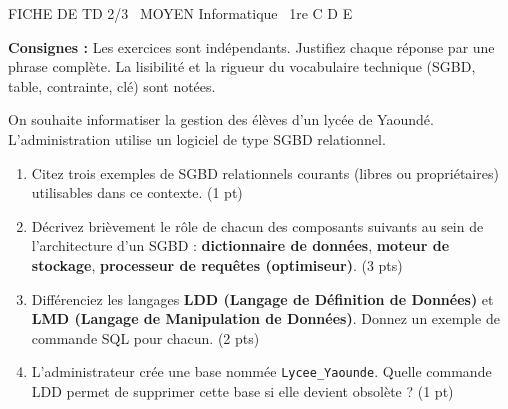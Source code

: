\documentclass[11pt]{article}
\begin{document}
\begin{tcolorbox}[enhanced,colback=popink,colframe=popink,arc=10pt,boxrule=0pt,left=12pt,right=12pt,top=9pt,bottom=9pt]
{\color{white}\popxbold\small FICHE DE TD 2/3 \textbullet\ MOYEN \hfill Informatique \textbullet\ 1re C D E\par}
\end{tcolorbox}
\vspace{4pt}
\noindent \textbf{Consignes :} Les exercices sont indépendants. Justifiez chaque réponse par une phrase complète. La lisibilité et la rigueur du vocabulaire technique (SGBD, table, contrainte, clé) sont notées.

\begin{exercice}
On souhaite informatiser la gestion des élèves d'un lycée de Yaoundé. L'administration utilise un logiciel de type SGBD relationnel.
\begin{enumerate}
    \item Citez trois exemples de SGBD relationnels courants (libres ou propriétaires) utilisables dans ce contexte. (1 pt)
    \item Décrivez brièvement le rôle de chacun des composants suivants au sein de l'architecture d'un SGBD : \textbf{dictionnaire de données}, \textbf{moteur de stockage}, \textbf{processeur de requêtes (optimiseur)}. (3 pts)
    \item Différenciez les langages \textbf{LDD (Langage de Définition de Données)} et \textbf{LMD (Langage de Manipulation de Données)}. Donnez un exemple de commande SQL pour chacun. (2 pts)
    \item L'administrateur crée une base nommée \texttt{Lycee\_Yaounde}. Quelle commande LDD permet de supprimer cette base si elle devient obsolète ? (1 pt)
\end{enumerate}
\end{exercice}
\end{document}

